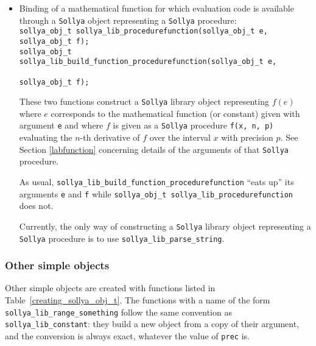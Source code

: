 \documentclass[a4paper]{article}
\newcommand{\sollya}{\texttt{Sollya}\xspace}
\begin{document}
\begin{itemize}
These two functions construct a \sollya object representing the
mathematical constant $c$ for which a pointer to a function
\verb|c(mpfr_t rop, mp_prec_t prec)| is provided. This code must
evaluate the constant to precision \verb|prec| and affect the result
to \verb|rop|. See Section \ref{lablibraryconstant} for details with
respect to \verb|prec|.

The same remark as above concerning the suggested displaying name
of the \sollya object applies for the \verb|name| argument.

\item Binding of a mathematical function for which evaluation code is 
available through a \sollya object representing a \sollya procedure: \\
\verb|sollya_obj_t sollya_lib_procedurefunction(sollya_obj_t e, sollya_obj_t f);|  \\
\verb|sollya_obj_t sollya_lib_build_function_procedurefunction(sollya_obj_t e, | \\
\verb|                                                         sollya_obj_t f);|  

These two functions construct a \sollya library object representing $f(e)$
where $e$ corresponds to the mathematical function (or constant) given with argument
\verb|e| and where $f$ is given as a \sollya procedure \verb|f(x, n, p)| evaluating the
$n$-th derivative of $f$ over the interval $x$ with precision $p$. See Section \ref{labfunction} 
concerning details of the arguments of that \sollya procedure.

As usual, \verb|sollya_lib_build_function_procedurefunction| ``eats
up'' its arguments \verb|e| and \verb|f| while
\verb|sollya_obj_t sollya_lib_procedurefunction| does not.

Currently, the only way of constructing a \sollya library object
representing a \sollya procedure is to use
\verb|sollya_lib_parse_string|.

\end{itemize}

\subsubsection{Other simple objects}
Other simple objects are created with functions listed in Table~\ref{creating_sollya_obj_t}. The functions with a name of the form \texttt{sollya\_lib\_range\_something} follow the same convention as \texttt{sollya\_lib\_constant}: they build a new object from a copy of their argument, and the conversion is always exact, whatever the value of \texttt{prec} is.
\end{document}
